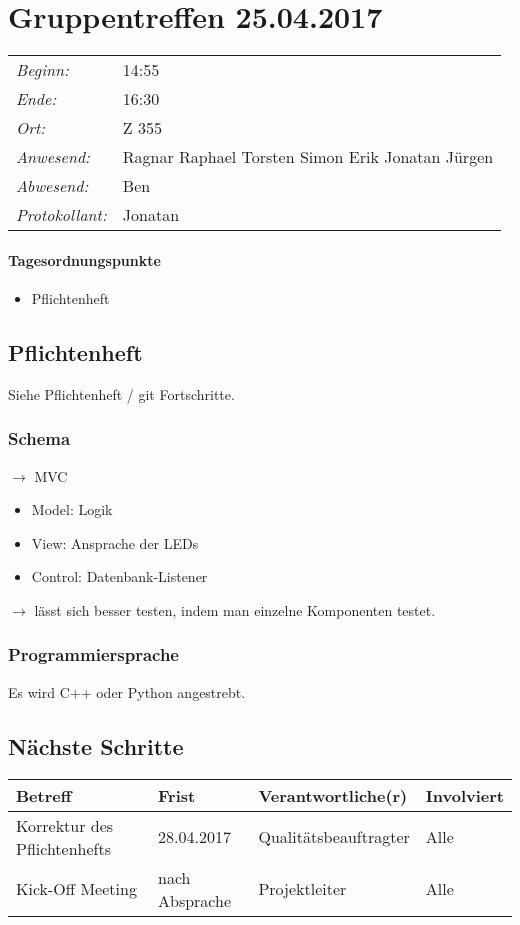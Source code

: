 \documentclass{scrartcl}
\date{25.04.2017}
\begin{document}
\maketitle
\section{Gruppentreffen 25.04.2017}
\begin{tabular}[t]{p{.25\linewidth} p{.25\linewidth}}
\emph{Beginn:}				& 14:55\\
\emph{Ende:}					& 16:30\\
\emph{Ort:}						& Z 355\\
\emph{Anwesend:}	& 
Ragnar\newline
Raphael\newline
Torsten\newline
Simon\newline
Erik\newline
Jonatan\newline
Jürgen
\\
\emph{Abwesend:}		 & 
Ben\newline
\\
\emph{Protokollant:}& Jonatan
\end{tabular}
\paragraph{Tagesordnungspunkte}
\begin{itemize}
\item Pflichtenheft
\end{itemize}

\subsection{Pflichtenheft}
Siehe Pflichtenheft / git Fortschritte.

\subsubsection{Schema}
$\to$ MVC
\begin{itemize}
\item Model: Logik
\item View: Ansprache der LEDs
\item Control: Datenbank-Listener
\end{itemize}

$\to$ lässt sich besser testen, indem man einzelne Komponenten testet.

\subsubsection{Programmiersprache}
Es wird C++ oder Python angestrebt.

\subsection{Nächste Schritte}
\begin{tabular}{L{.249} L{.2} L{.25} L{.25}}
Betreff & Frist & Verantwortliche(r) & Involviert\\\hline
Korrektur des Pflichtenhefts & 28.04.2017 & Qualitätsbeauftragter & Alle\\
Kick-Off Meeting & nach Absprache & Projektleiter & Alle
\end{tabular}
\end{document}
